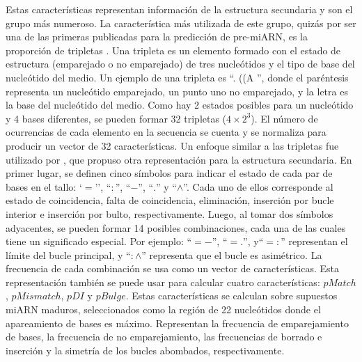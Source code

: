 Estas características representan información de la estructura secundaria y son el grupo más numeroso. La característica más utilizada de este grupo,
quizás por ser una de las primeras publicadas para la predicción de pre-miARN, es la proporción de tripletas \citep{xue2005classification}. Una tripleta es un elemento
formado con el estado de estructura (emparejado o no emparejado) de tres nucleótidos y el tipo de base del nucleótido del medio. Un ejemplo de una tripleta
es ``. ((A '', donde el paréntesis representa un nucleótido emparejado, un punto uno no emparejado, y la letra es la base del nucleótido del medio. Como hay
2 estados posibles para un nucleótido y 4 bases diferentes, se pueden formar 32 tripletas ($4\times2^{3} $). El número de ocurrencias de cada elemento
 en la secuencia se cuenta y se normaliza para producir un vector de 32 características. Un enfoque similar a las tripletas fue utilizado por
\cite{huang2007mirfinder}, que propuso otra representación para la estructura secundaria. En primer lugar, se definen cinco símbolos para indicar el estado de cada par
de bases en el tallo: `$=$'', ``$:$'', ``$-$'', ``$.$'' y ``$\wedge$''. Cada uno de ellos corresponde al estado de coincidencia, falta de coincidencia,
eliminación, inserción por bucle interior e inserción por bulto, respectivamente. Luego, al tomar dos símbolos adyacentes, se pueden formar 14 posibles
combinaciones, cada una de las cuales tiene un significado especial. Por ejemplo: ``$=-$'', ``$=.$'', y``$=:$'' representan el límite del bucle principal, y
``$:\wedge$'' representa que el bucle es asimétrico. La frecuencia de cada combinación se usa como un vector de características. Esta representación
también se puede usar para calcular cuatro características: $pMatch$, $pMismatch$, $pDI$ y $pBulge$. Estas características se calculan sobre supuestos miARN
maduros, seleccionados como la región de 22 nucleótidos donde el apareamiento de bases es máximo. Representan la frecuencia de emparejamiento de bases, la
frecuencia de no emparejamiento, las frecuencias de borrado e inserción y la simetría de los bucles abombados, respectivamente.

